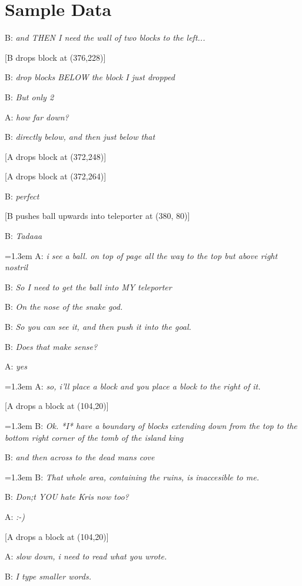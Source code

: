 \section{Sample Data}

{\footnotesize
\begin{example}
\parbox[t]{0.9\columnwidth}{
B: \textit{and THEN I need the wall of two blocks to the left...}

\strut[B drops block at (376,228)]

B: \textit{drop blocks BELOW the block I just dropped}

B: \textit{But only 2}

A: \textit{how far down?}

B: \textit{directly below, and then just below that}

\strut[A drops block at (372,248)]
\strut[A drops block at (372,264)]

B: \textit{perfect}

\strut[B pushes ball upwards into teleporter at (380, 80)]

B: \textit{Tadaaa}

\hangindent=1.3em A: \textit{i see a ball.  on top of page all the way to the top but
  above right nostril}
}
\label{ex:instructions}
\end{example}
}




{\footnotesize
\begin{example}
\parbox[t]{0.9\columnwidth}{
B: \textit{So I need to get the ball into MY teleporter}

B: \textit{On the nose of the snake god.}

B: \textit{So you can see it, and then push it into the goal.}

B: \textit{Does that make sense?}

A: \textit{yes}
}
\label{ex:strategy}
\end{example}
}




{\footnotesize
\begin{example}
\parbox[t]{0.9\columnwidth}{
\hangindent=1.3em A: \textit{so, i'll place a block and you place a block to the right of it.}

[A drops a block at (104,20)]

\hangindent=1.3em B: \textit{Ok. *I* have a boundary of blocks extending down from the top to the bottom right corner of  the tomb of the island king}

B: \textit{and then across to the dead mans cove}

\hangindent=1.3em B: \textit{That whole area, containing the ruins, is inaccesible to me.}

B: \textit{Don;t YOU hate Kris now too?}

A: \textit{:-)}

[A drops a block at (104,20)]

A: \textit{slow down, i need to read what you wrote.}

B: \textit{I type smaller words.}
}
\label{ex:comparing}
\end{example}
}
